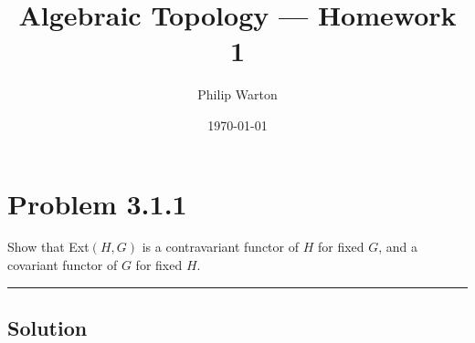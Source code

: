 \documentclass{article}
\theoremstyle{definition}
\begin{document}
\title{Algebraic Topology --- Homework 1}
\author{Philip Warton}
\date{\today}
\maketitle

\section*{Problem 3.1.1}
    Show that Ext$(H,G)$ is a contravariant functor of $H$ for fixed $G$, 
    and a covariant functor of $G$ for fixed $H$.
    \\
    \par\noindent\rule{\textwidth}{0.4pt}
    \subsection*{Solution}
\end{document}
